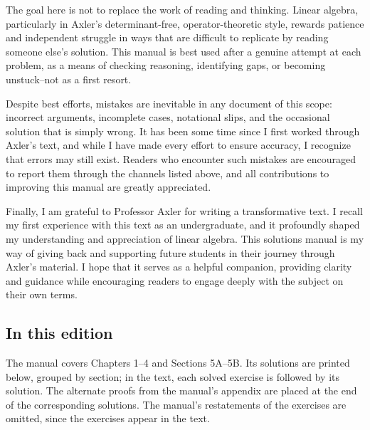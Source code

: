 The goal here is not to replace the work of reading and thinking. Linear
algebra, particularly in Axler's determinant-free, operator-theoretic style,
rewards patience and independent struggle in ways that are difficult to
replicate by reading someone else's solution. This manual is best used after a
genuine attempt at each problem, as a means of checking reasoning, identifying
gaps, or becoming unstuck--not as a first resort.

Despite best efforts, mistakes are inevitable in any document of this scope:
incorrect arguments, incomplete cases, notational slips, and the occasional
solution that is simply wrong. It has been some time since I first worked
through Axler's text, and while I have made every effort to ensure accuracy, I
recognize that errors may still exist. Readers who encounter such mistakes are
encouraged to report them through the channels listed above, and all
contributions to improving this manual are greatly appreciated.

Finally, I am grateful to Professor Axler for writing a transformative text. I
recall my first experience with this text as an undergraduate, and it
profoundly shaped my understanding and appreciation of linear algebra. This
solutions manual is my way of giving back and supporting future students in
their journey through Axler's material. I hope that it serves as a helpful
companion, providing clarity and guidance while encouraging readers to engage
deeply with the subject on their own terms.

\subsection*{In this edition}

The manual covers Chapters 1--4 and Sections 5A--5B. Its solutions are printed
below, grouped by section; in the text, each solved exercise is followed by its
solution. The alternate proofs from the manual's appendix are placed at the end
of the corresponding solutions. The manual's restatements of the exercises are
omitted, since the exercises appear in the text.
